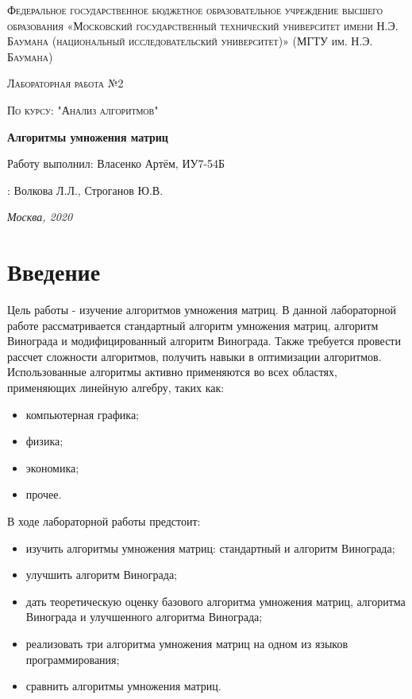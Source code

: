 \documentclass[12pt]{report}
\begin{document}
\begin{titlepage}
	\centering
	{\scshape\LARGE Федеральное государственное бюджетное образовательное учреждение высшего образования «Московский государственный технический университет имени Н.Э. Баумана (национальный исследовательский университет)» (МГТУ им. Н.Э. Баумана) \par}
	\vspace{3cm}
	{\scshape\Large Лабораторная работа №2\par}
	\vspace{0.5cm}	
	{\scshape\Large По курсу: "Анализ алгоритмов"\par}
	\vspace{1.5cm}
	{\huge\bfseries Алгоритмы умножения матриц\par}
	\vspace{2cm}
	\Large Работу выполнил: Власенко Артём, ИУ7-54Б\par
	\vspace{0.5cm}
	:  Волкова Л.Л., Строганов Ю.В.\par

	\vfill
	\large \textit {Москва, 2020} \par
\end{titlepage}

\tableofcontents

\newpage
\chapter*{Введение}
Цель работы - изучение алгоритмов умножения матриц. В данной лабораторной работе рассматривается стандартный алгоритм умножения матриц, алгоритм Винограда и модифицированный алгоритм Винограда. Также требуется провести рассчет сложности алгоритмов, получить навыки в оптимизации алгоритмов.
Использованные алгоритмы активно применяются во всех областях, применяющих линейную алгебру, таких как:
\begin{itemize}
	\item компьютерная графика;
	\item физика;
	\item экономика;
	\item прочее.
\end{itemize}

В ходе лабораторной работы предстоит:
\begin{itemize}
	\item изучить алгоритмы умножения матриц: стандартный и алгоритм Винограда;
	\item улучшить алгоритм Винограда;
	\item дать теоретическую оценку базового алгоритма умножения матриц, алгоритма Винограда и улучшенного алгоритма Винограда;
	\item реализовать три алгоритма умножения матриц на одном из языков программирования;
	\item сравнить алгоритмы умножения матриц.
\end{itemize}
\end{document}
